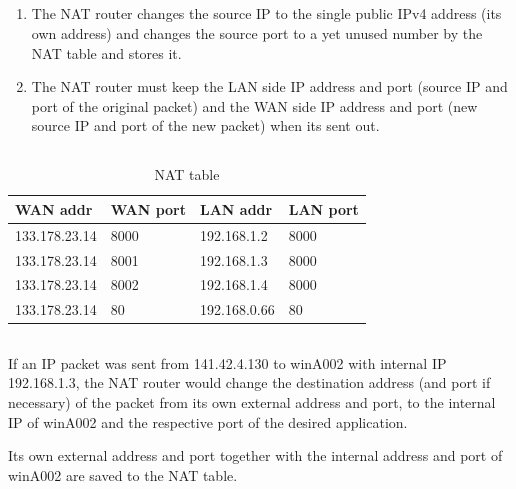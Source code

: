 \documentclass{article}
\begin{document}
    \subsection{}

    \begin{enumerate}[label=(\roman*)]
        \item The NAT router changes the source IP to the single public IPv4 address (its own address) and changes the source port to a yet unused number by the NAT table and stores it.
        \item The NAT router must keep the LAN side IP address and port (source IP and port of the original packet) and the WAN side IP address and port (new source IP and port of the new packet) when its sent out.
    \end{enumerate}

    \subsection{}

    \begin{table}[H]
    \centering
        \begin{tabular}{l l l l}
            \textbf{WAN addr} & \textbf{WAN port} & \textbf{LAN addr} & \textbf{LAN port} \\
            \hline
            133.178.23.14 & 8000 & 192.168.1.2  & 8000 \\
            133.178.23.14 & 8001 & 192.168.1.3  & 8000 \\
            133.178.23.14 & 8002 & 192.168.1.4  & 8000 \\
            133.178.23.14 & 80   & 192.168.0.66 & 80
        \end{tabular}
    \caption{NAT table}
    \label{tab:nat}
    \end{table}
    
    
    \subsection{}

    If an IP packet was sent from 141.42.4.130 to winA002 with internal IP 192.168.1.3, the NAT router would change the destination address (and port if necessary) of the packet from its own external address and port, to the internal IP of winA002 and the respective port of the desired application. 

    Its own external address and port together with the internal address and port of winA002 are saved to the NAT table. 
\end{document}
